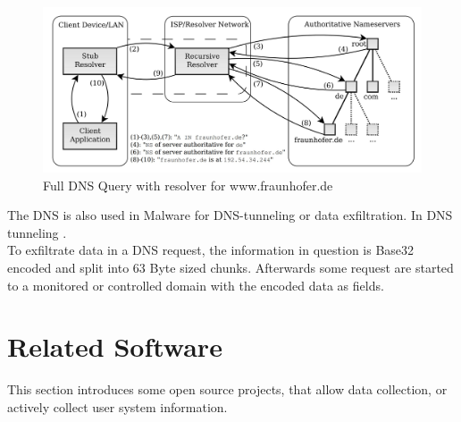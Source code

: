         
        
        
        \begin{figure}
            \centering
            \includegraphics[width=\textwidth]{latex/figures/dns_query.jpg}
            \caption[Full DNS Query with resolver for www.fraunhofer.de]{Full DNS Query with resolver for                 www.fraunhofer.de\cite{friedewald_privacy_2018}}
            \label{fig:dns_query}
        \end{figure}
        
        
        The DNS is also used in Malware for DNS-tunneling or data exfiltration.
        In DNS tunneling \cite{das_detection_2017}.\\
        To exfiltrate data in a DNS request, the information in question is Base32 encoded and split into 63 Byte sized chunks. Afterwards some request are started to a monitored or controlled domain with the encoded data as fields\cite{mertens_infosec_2017}.\\
        
\newpage
\section{Related Software}
    \label{sec:related:related_sw}
    This section introduces some open source projects, that allow data collection, or actively collect user system information. 
    

